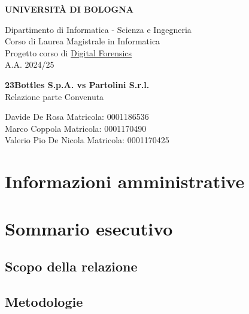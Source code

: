 \documentclass[a4paper,12pt]{report}
\begin{document}
\begin{titlepage}
    \centering
    \vspace*{0.1cm}

    \Huge
    \textbf{UNIVERSITÀ DI BOLOGNA}

    \vspace{1cm}
    \Large
    Dipartimento di Informatica - Scienza e Ingegneria \\
    Corso di Laurea Magistrale in Informatica \\\vspace{1cm}
    Progetto corso di \href{https://www.unibo.it/it/studiare/dottorati-master-specializzazioni-e-altra-formazione/insegnamenti/insegnamento/2024/479039}{Digital Forensics} \\
    A.A. 2024/25

    \vspace{5.5cm}
    \textbf{\LARGE 23Bottles S.p.A. vs Partolini S.r.l.}\\\vspace{0.3cm}
    \Large Relazione parte Convenuta

    \vfill

    \vfill

    \large
    Davide De Rosa \hfill Matricola: 0001186536\\
    Marco Coppola \hfill Matricola: 0001170490\\
    Valerio Pio De Nicola \hfill Matricola: 0001170425\\
\end{titlepage}

\tableofcontents
\newpage

\chapter{Informazioni amministrative}


\pagebreak

\chapter{Sommario esecutivo}


\section{Scopo della relazione}


\section{Metodologie}

\end{document}
